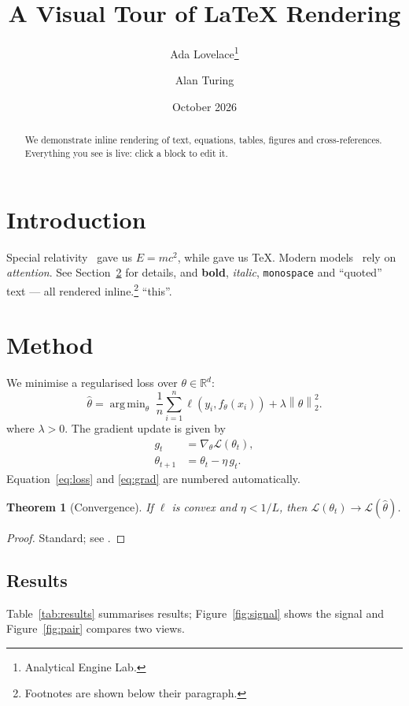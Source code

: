 \documentclass[11pt]{article}
\title{A Visual Tour of \LaTeX{} Rendering}
\author{Ada Lovelace\thanks{Analytical Engine Lab.} \and Alan Turing}
\date{October 2026}
\newcommand{\R}{\mathbb{R}}
\newcommand{\norm}[1]{\left\lVert #1 \right\rVert}
\DeclareMathOperator*{\argmin}{arg\,min}
\newtheorem{theorem}{Theorem}
\begin{document}
\maketitle

\begin{abstract}
We demonstrate inline rendering of text, equations, tables, figures and
cross-references. Everything you see is live: click a block to edit it.
\end{abstract}

\section{Introduction}\label{sec:intro}
Special relativity~\cite{einstein1905} gave us $E = mc^2$, while
\citet{knuth1984} gave us \TeX{}. Modern models~\cite{vaswani2017,knuth1984}
rely on \emph{attention}. See Section~\ref{sec:method} for details, and
\textbf{bold}, \textit{italic}, \texttt{monospace} and ``quoted'' text --- all
rendered inline.\footnote{Footnotes are shown below their paragraph.}
``this''. %

\section{Method}
\label{sec:method}
We minimise a regularised loss over $\theta \in \R^d$:
\begin{equation}
  \hat\theta = \argmin_{\theta} \; \frac{1}{n}\sum_{i=1}^{n} \ell(y_i, f_\theta(x_i)) + \lambda \norm{\theta}_2^2 .
  \label{eq:loss}
\end{equation}
where $\lambda > 0$. The gradient update is given by
\begin{align}
  g_t &= \nabla_\theta \mathcal{L}(\theta_t), \label{eq:grad}\\
  \theta_{t+1} &= \theta_t - \eta\, g_t. \nonumber
\end{align}
Equation~\eqref{eq:loss} and \eqref{eq:grad} are numbered automatically.

\begin{theorem}[Convergence]\label{thm:conv}
If $\ell$ is convex and $\eta < 1/L$, then $\mathcal{L}(\theta_t) \to \mathcal{L}(\hat\theta)$.
\end{theorem}

\begin{proof}
Standard; see \cite{knuth1984}.
\end{proof}

\subsection{Results}
Table~\ref{tab:results} summarises results; Figure~\ref{fig:signal} shows the
signal and Figure~\ref{fig:pair} compares two views.
\end{document}
